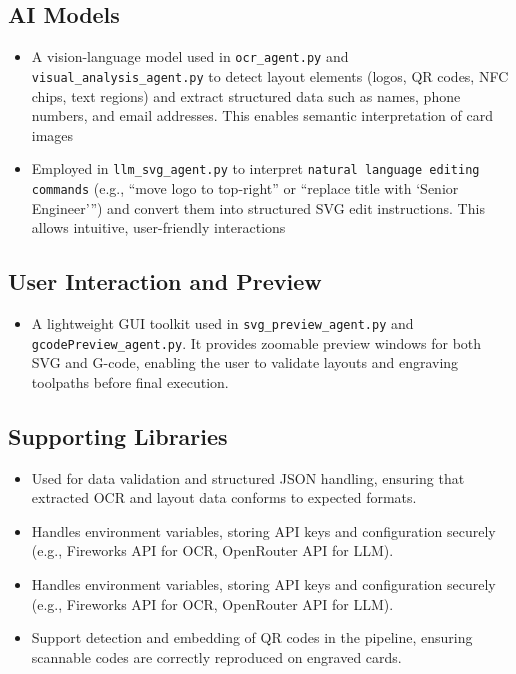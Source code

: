 \subsection{AI Models}
\begin{itemize}
	\item {}
	
A vision-language model used in \texttt{ocr\_agent.py} and \texttt{visual\_analysis\_agent.py} to detect layout elements (logos, QR codes, NFC chips, text regions) and extract structured data such as names, phone numbers, and email addresses. This enables semantic interpretation of card images
	
\item {}
	
Employed in \texttt{llm\_svg\_agent.py} to interpret \texttt{natural language editing commands} (e.g., “move logo to top-right” or “replace title with ‘Senior Engineer’”) and convert them into structured SVG edit instructions. This allows intuitive, user-friendly interactions
	
\end{itemize}

\subsection{User Interaction and Preview}
\begin{itemize}
	\item {}
	
A lightweight GUI toolkit used in \texttt{svg\_preview\_agent.py} and \texttt{gcodePreview\_agent.py}. It provides zoomable preview windows for both SVG and G-code, enabling the user to validate layouts and engraving toolpaths before final execution.
	
\end{itemize}
 
 \subsection{Supporting Libraries}
 \begin{itemize}
 	\item {}
 	
 	Used for data validation and structured JSON handling, ensuring that extracted OCR and layout data conforms to expected formats.
 	
 	\item {}
 	
 	Handles environment variables, storing API keys and configuration securely (e.g., Fireworks API for OCR, OpenRouter API for LLM).
 	
 	\item {}
 	
 	Handles environment variables, storing API keys and configuration securely (e.g., Fireworks API for OCR, OpenRouter API for LLM).
 	
 	\item {}
 	Support detection and embedding of QR codes in the pipeline, ensuring scannable codes are correctly reproduced on engraved cards.
 	
 \end{itemize}